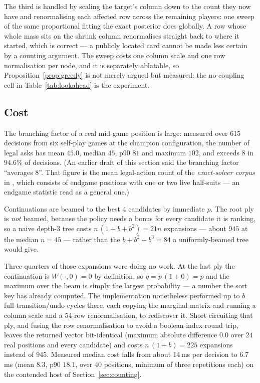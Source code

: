 \documentclass[11pt,a4paper]{article}
\begin{document}
The third is handled by scaling the target's column down to the count they now
have and renormalising each affected row across the remaining players: one sweep
of the same proportional fitting the exact posterior does globally. A row whose
whole mass sits on the shrunk column renormalises straight back to where it
started, which is correct --- a publicly located card cannot be made less
certain by a counting argument. The sweep costs one column scale and one row
normalisation per node, and it is separately ablatable, so
Proposition~\ref{prop:greedy} is not merely argued but measured: the
no-coupling cell in Table~\ref{tab:lookahead} is the experiment.

\subsection{Cost}
\label{sec:lookahead-cost}

The branching factor of a real mid-game position is large: measured over 615
decisions from six self-play games at the champion configuration, the number of
legal asks has mean $45.0$, median $45$, p90 $81$ and maximum $102$, and exceeds
$8$ in $94.6\%$ of decisions. (An earlier draft of this section said the
branching factor ``averages 8''. That figure is the mean legal-action count of
the \emph{exact-solver corpus} in
, which consists of endgame positions
with one or two live half-suits --- an endgame statistic read as a general one.)

Continuations are beamed to the best $4$ candidates by immediate $p$. The root
ply is \emph{not} beamed, because the policy needs a bonus for every candidate it
is ranking, so a naive depth-3 tree costs $n\,(1 + b + b^2) = 21n$ expansions ---
about $945$ at the median $n = 45$ --- rather than the $b + b^2 + b^3 = 84$ a
uniformly-beamed tree would give.

Three quarters of those expansions were doing no work. At the last ply the
continuation is $W(\cdot, 0) = 0$ by definition, so $q = p\,(1 + 0) = p$ and the
maximum over the beam is simply the largest probability --- a number the sort key
has already computed. The implementation nonetheless performed up to $b$ full
transition/undo cycles there, each copying the marginal matrix and running a
column scale and a $54$-row renormalisation, to rediscover it. Short-circuiting
that ply, and fusing the row renormalisation to avoid a boolean-index round trip,
leaves the returned vector bit-identical (maximum absolute difference $0.0$ over
$24$ real positions and every candidate) and costs $n\,(1 + b) = 225$ expansions
instead of $945$. Measured median cost falls from about $14$\,ms per decision to
$6.7$\,ms (mean $8.3$, p90 $18.1$, over $40$ positions, minimum of three
repetitions each) on the contended host of Section~\ref{sec:counting}.
\end{document}
